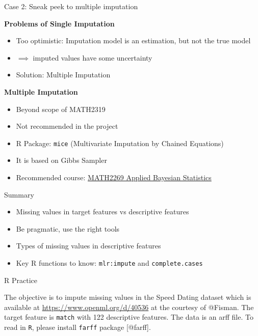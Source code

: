 \documentclass[ignorenonframetext,]{beamer}
\providecommand{\tightlist}{%
  \setlength{\itemsep}{0pt}\setlength{\parskip}{0pt}}
\begin{document}
\begin{frame}[fragile]{Case 2: Sneak peek to multiple imputation}

\textbf{Problems of Single Imputation}

\begin{itemize}[<+->]
\tightlist
\item
  Too optimistic: Imputation model is an estimation, but not the true
  model
\item
  \(\implies\) imputed values have some uncertainty
\item
  Solution: Multiple Imputation
\end{itemize}

\textbf{Multiple Imputation}

\begin{itemize}[<+->]
\tightlist
\item
  Beyond scope of MATH2319
\item
  Not recommended in the project
\item
  R Package: \texttt{mice} (Multivariate Imputation by Chained
  Equations)
\item
  It is based on Gibbs Sampler
\item
  Recommended course:
  \href{http://www1.rmit.edu.au/courses/050645}{MATH2269 Applied
  Bayesian Statistics}
\end{itemize}

\end{frame}

\begin{frame}[fragile]{Summary}

\begin{itemize}[<+->]
\tightlist
\item
  Missing values in target features vs descriptive features
\item
  Be pragmatic, use the right tools
\item
  Types of missing values in descriptive features
\item
  Key R functions to know: \texttt{mlr:impute} and
  \texttt{complete.cases}
\end{itemize}

\end{frame}

\begin{frame}[fragile]{R Practice}

The objective is to impute missing values in the Speed Dating dataset
which is available at \url{https://www.openml.org/d/40536} at the
courtesy of @Fisman. The target feature is \texttt{match} with 122
descriptive features. The data is an arff file. To read in \texttt{R},
please install \texttt{farff} package {[}@farff{]}.

\end{frame}
\end{document}
